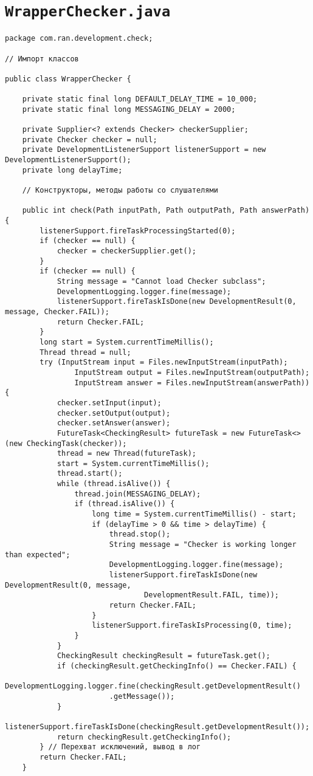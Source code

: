 \section*{\texttt{WrapperChecker.java}}
\begin{verbatim}
package com.ran.development.check;

// Импорт классов

public class WrapperChecker {

    private static final long DEFAULT_DELAY_TIME = 10_000;
    private static final long MESSAGING_DELAY = 2000;

    private Supplier<? extends Checker> checkerSupplier;
    private Checker checker = null;
    private DevelopmentListenerSupport listenerSupport = new DevelopmentListenerSupport();
    private long delayTime;

    // Конструкторы, методы работы со слушателями

    public int check(Path inputPath, Path outputPath, Path answerPath) {
        listenerSupport.fireTaskProcessingStarted(0);
        if (checker == null) {
            checker = checkerSupplier.get();
        }
        if (checker == null) {
            String message = "Cannot load Checker subclass";
            DevelopmentLogging.logger.fine(message);
            listenerSupport.fireTaskIsDone(new DevelopmentResult(0, message, Checker.FAIL));
            return Checker.FAIL;
        }
        long start = System.currentTimeMillis();
        Thread thread = null;
        try (InputStream input = Files.newInputStream(inputPath);
                InputStream output = Files.newInputStream(outputPath);
                InputStream answer = Files.newInputStream(answerPath)) {
            checker.setInput(input);
            checker.setOutput(output);
            checker.setAnswer(answer);
            FutureTask<CheckingResult> futureTask = new FutureTask<>(new CheckingTask(checker));
            thread = new Thread(futureTask);
            start = System.currentTimeMillis();
            thread.start();
            while (thread.isAlive()) {
                thread.join(MESSAGING_DELAY);
                if (thread.isAlive()) {
                    long time = System.currentTimeMillis() - start;
                    if (delayTime > 0 && time > delayTime) {
                        thread.stop();
                        String message = "Checker is working longer than expected";
                        DevelopmentLogging.logger.fine(message);
                        listenerSupport.fireTaskIsDone(new DevelopmentResult(0, message,
                                DevelopmentResult.FAIL, time));
                        return Checker.FAIL;
                    }
                    listenerSupport.fireTaskIsProcessing(0, time);
                }
            }
            CheckingResult checkingResult = futureTask.get();
            if (checkingResult.getCheckingInfo() == Checker.FAIL) {
                DevelopmentLogging.logger.fine(checkingResult.getDevelopmentResult()
                        .getMessage());
            }
            listenerSupport.fireTaskIsDone(checkingResult.getDevelopmentResult());
            return checkingResult.getCheckingInfo();
        } // Перехват исключений, вывод в лог
        return Checker.FAIL;
    }


\end{verbatim}
